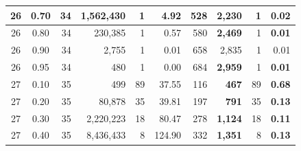 \begin{table}[H]
\begin{tabular}{|c|c|r|r|r|r|r|r|r|r|}
        26                              & 0.70                               & 34                                              & 1,562,430                                        & 1             & 4.92          & 528           & \textbf{2,230}   & 1             & \textbf{0.02} \\ \hline
        26                              & 0.80                               & 34                                              & 230,385                                          & 1             & 0.57          & 580           & \textbf{2,469}   & 1             & \textbf{0.01} \\ \hline
        26                              & 0.90                               & 34                                              & 2,755                                            & 1             & 0.01          & 658           & 2,835            & 1             & 0.01          \\ \hline
        26                              & 0.95                               & 34                                              & 480                                              & 1             & 0.00          & 684           & \textbf{2,959}   & 1             & \textbf{0.01} \\ \hline
        27                              & 0.10                               & 35                                              & 499                                              & 89            & 37.55         & 116           & \textbf{ 467}    & 89            & \textbf{0.68} \\ \hline
        27                              & 0.20                               & 35                                              & 80,878                                           & 35            & 39.81         & 197           & \textbf{ 791}    & 35            & \textbf{0.13} \\ \hline
        27                              & 0.30                               & 35                                              & 2,220,223                                        & 18            & 80.47         & 278           & \textbf{1,124}   & 18            & \textbf{0.11} \\ \hline
        27                              & 0.40                               & 35                                              & 8,436,433                                        & 8             & 124.90        & 332           & \textbf{1,351}   & 8             & \textbf{0.13} \\ \hline

\end{tabular}
\end{table}
